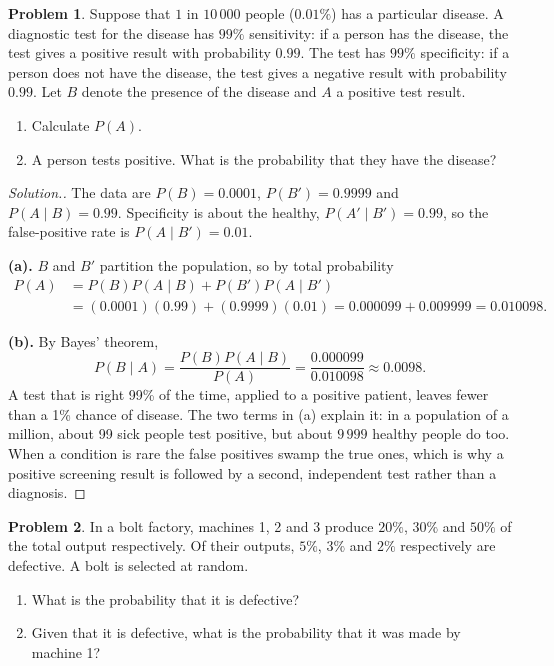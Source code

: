 \documentclass[12pt,a4paper]{report}
\theoremstyle{definition}
\theoremstyle{plain}
\theoremstyle{definition}
\newtheorem{problemx}{Problem}[section]
\newenvironment{problem}{\begin{problemx}}{\end{problemx}}
\newenvironment{solution}
  {\renewcommand{\qedsymbol}{}\begin{proof}[\textit{Solution}.]}
  {\end{proof}}
\begin{document}
\begin{problem}
Suppose that $1$ in $10\,000$ people ($0.01\%$) has a particular disease. A diagnostic test
for the disease has $99\%$ sensitivity: if a person has the disease, the test gives a
positive result with probability $0.99$. The test has $99\%$ specificity: if a person does
not have the disease, the test gives a negative result with probability $0.99$. Let $B$
denote the presence of the disease and $A$ a positive test result.
\begin{enumerate}
\item[(a).] Calculate $P(A)$.
\item[(b).] A person tests positive. What is the probability that they have the disease?
\end{enumerate}
\end{problem}

\begin{solution}
The data are $P(B) = 0.0001$, $P(B') = 0.9999$ and $P(A\mid B) = 0.99$. Specificity is
about the healthy, $P(A'\mid B') = 0.99$, so the false-positive rate is
$P(A\mid B') = 0.01$.

\textbf{(a).} $B$ and $B'$ partition the population, so by total probability
\begin{align*}
P(A) &= P(B)P(A\mid B)+P(B')P(A\mid B')\\
&= (0.0001)(0.99)+(0.9999)(0.01) = 0.000099+0.009999 = 0.010098.
\end{align*}

\textbf{(b).} By Bayes' theorem,
\[P(B\mid A) = \frac{P(B)P(A\mid B)}{P(A)} = \frac{0.000099}{0.010098}\approx 0.0098.\]
A test that is right 99\% of the time, applied to a positive patient, leaves fewer than a
1\% chance of disease. The two terms in (a) explain it: in a population of a million,
about 99 sick people test positive, but about $9\,999$ healthy people do too. When a
condition is rare the false positives swamp the true ones, which is why a positive
screening result is followed by a second, independent test rather than a diagnosis.
\end{solution}

\begin{problem}
In a bolt factory, machines 1, 2 and 3 produce $20\%$, $30\%$ and $50\%$ of the total
output respectively. Of their outputs, $5\%$, $3\%$ and $2\%$ respectively are defective.
A bolt is selected at random.
\begin{enumerate}
\item[(a).] What is the probability that it is defective?
\item[(b).] Given that it is defective, what is the probability that it was made by
machine 1?
\end{enumerate}
\end{problem}
\end{document}
